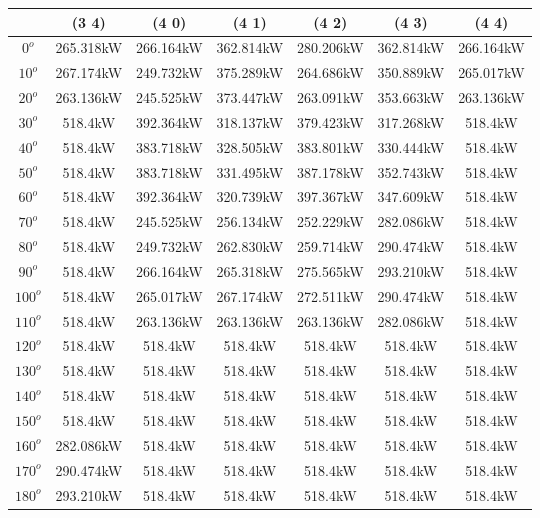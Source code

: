         \begin{table}[H]
        	\centering
        	\begin{tabular}{|c|c|c|c|c|c|c|} \hline
        			& (3 4)		& (4 0)		& (4 1)		& (4 2)		& (4 3)		& (4 4)		\\ \hline
		$0^o$	& 265.318kW	& 266.164kW	& 362.814kW	& 280.206kW	& 362.814kW	& 266.164kW	\\ \hline
		$10^o$	& 267.174kW	& 249.732kW	& 375.289kW	& 264.686kW	& 350.889kW	& 265.017kW	\\ \hline
		$20^o$	& 263.136kW	& 245.525kW	& 373.447kW	& 263.091kW	& 353.663kW	& 263.136kW	\\ \hline
		$30^o$	& 518.4kW	& 392.364kW	& 318.137kW	& 379.423kW	& 317.268kW	& 518.4kW	\\ \hline
		$40^o$	& 518.4kW	& 383.718kW	& 328.505kW	& 383.801kW	& 330.444kW	& 518.4kW	\\ \hline
		$50^o$	& 518.4kW	& 383.718kW	& 331.495kW	& 387.178kW	& 352.743kW	& 518.4kW	\\ \hline
		$60^o$	& 518.4kW	& 392.364kW	& 320.739kW	& 397.367kW	& 347.609kW	& 518.4kW	\\ \hline
		$70^o$	& 518.4kW	& 245.525kW	& 256.134kW	& 252.229kW	& 282.086kW	& 518.4kW	\\ \hline
		$80^o$	& 518.4kW	& 249.732kW	& 262.830kW	& 259.714kW	& 290.474kW	& 518.4kW	\\ \hline
		$90^o$	& 518.4kW	& 266.164kW	& 265.318kW	& 275.565kW	& 293.210kW	& 518.4kW	\\ \hline
		$100^o$	& 518.4kW	& 265.017kW	& 267.174kW	& 272.511kW	& 290.474kW	& 518.4kW	\\ \hline
		$110^o$	& 518.4kW	& 263.136kW	& 263.136kW	& 263.136kW	& 282.086kW	& 518.4kW	\\ \hline
		$120^o$	& 518.4kW	& 518.4kW	& 518.4kW	& 518.4kW	& 518.4kW	& 518.4kW	\\ \hline
		$130^o$	& 518.4kW	& 518.4kW	& 518.4kW	& 518.4kW	& 518.4kW	& 518.4kW	\\ \hline
		$140^o$	& 518.4kW	& 518.4kW	& 518.4kW	& 518.4kW	& 518.4kW	& 518.4kW	\\ \hline
		$150^o$	& 518.4kW	& 518.4kW	& 518.4kW	& 518.4kW	& 518.4kW	& 518.4kW	\\ \hline
		$160^o$	& 282.086kW	& 518.4kW	& 518.4kW	& 518.4kW	& 518.4kW	& 518.4kW	\\ \hline
		$170^o$	& 290.474kW	& 518.4kW	& 518.4kW	& 518.4kW	& 518.4kW	& 518.4kW	\\ \hline
		$180^o$	& 293.210kW	& 518.4kW	& 518.4kW	& 518.4kW	& 518.4kW	& 518.4kW	\\ \hline

\end{tabular}
\end{table}
